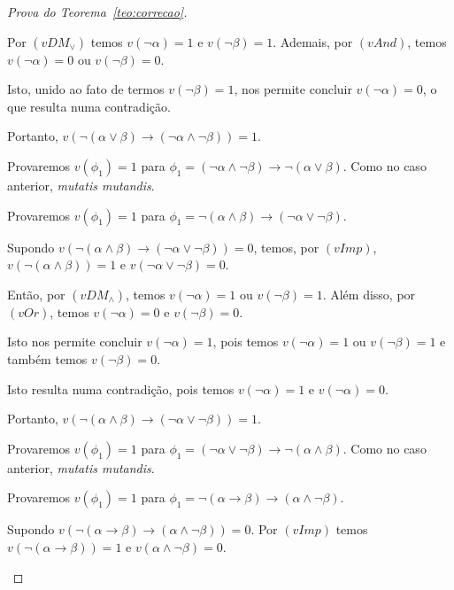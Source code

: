 \begin{proof}[Prova do Teorema~\ref{teo:correcao}]
\begin{provaporcasos}
\begin{provaporsubcasos}
                    Por $(vDM_{\lor})$ temos $v(\neg \alpha) = 1$ e $v(\neg \beta) = 1$. Ademais, por $(vAnd)$, temos $v(\neg \alpha) = 0$ ou $v(\neg \beta) = 0$. 
                    
                    Isto, unido ao fato de termos $v(\neg \beta) = 1$, nos permite concluir $v(\neg \alpha) = 0$, o que resulta numa contradição. 
                    
                    Portanto, $v(\neg (\alpha \lor \beta) \to (\neg \alpha \land \neg \beta)) = 1$.


                \subcasodeprova Provaremos $v(\phi_{1}) = 1$ para $\phi_{1} = (\neg \alpha \land \neg \beta) \to \neg (\alpha \lor \beta)$. Como no caso anterior, \textit{mutatis mutandis}.

                \subcasodeprova Provaremos $v(\phi_{1}) = 1$ para $\phi_{1} = \neg(\alpha \land \beta) \to (\neg \alpha \lor \neg \beta)$. 
                
                Supondo $v(\neg(\alpha \land \beta) \to (\neg \alpha \lor \neg \beta)) = 0$, temos, por $(vImp)$, $v(\neg(\alpha \land \beta)) = 1$ e $v(\neg \alpha \lor \neg \beta) = 0$. 
                
                Então, por $(vDM_{\land})$, temos $v(\neg \alpha) = 1$ ou $v(\neg \beta) = 1$. Além disso, por $(vOr)$, temos $v(\neg \alpha) = 0$ e $v(\neg \beta) = 0$. 
                
                Isto nos permite concluir $v(\neg \alpha) = 1$, pois temos $v(\neg \alpha) = 1$ ou $v(\neg \beta) = 1$ e também temos $v(\neg \beta) = 0$. 
                
                Isto resulta numa contradição, pois temos $v(\neg \alpha) = 1$ e $v(\neg \alpha) = 0$. 
                
                Portanto, $v(\neg(\alpha \land \beta) \to (\neg \alpha \lor \neg \beta)) = 1$.

                \subcasodeprova Provaremos $v(\phi_{1}) = 1$ para $\phi_{1} = (\neg \alpha \lor \neg \beta) \to \neg (\alpha \land \beta)$. Como no caso anterior, \textit{mutatis mutandis}.

                \subcasodeprova Provaremos $v(\phi_{1}) = 1$ para $\phi_{1} = \neg (\alpha \to \beta) \to(\alpha \land \neg \beta)$. 
                
                Supondo $v(\neg (\alpha \to \beta) \to (\alpha \land \neg \beta)) = 0$. Por $(vImp)$ temos $v(\neg (\alpha \to \beta)) = 1$ e $v(\alpha \land \neg \beta) = 0$. 
                

\end{provaporsubcasos}
\end{provaporcasos}
\end{proof}
